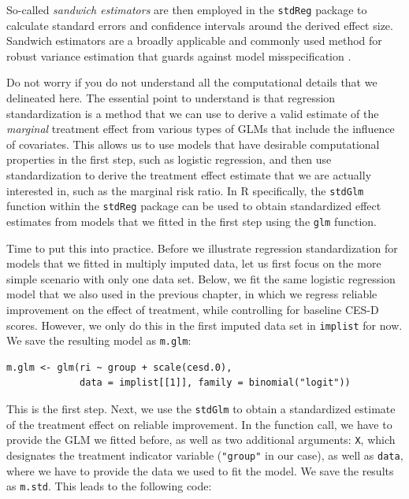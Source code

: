 So-called \emph{sandwich estimators} are then employed in the \texttt{stdReg} package to calculate standard errors and confidence intervals around the derived effect size. Sandwich estimators are a broadly applicable and commonly used method for robust variance estimation that guards against model misspecification \citep[see e.g.][, chap. 4.2.2]{aronow2019foundations}. 

Do not worry if you do not understand all the computational details that we delineated here. The essential point to understand is that regression standardization is a method that we can use to derive a valid estimate of the \emph{marginal} treatment effect from various types of GLMs that include the influence of covariates. This allows us to use models that have desirable computational properties in the first step, such as logistic regression, and then use standardization to derive the treatment effect estimate that we are actually interested in, such as the marginal risk ratio. In \textsf{R} specifically, the \texttt{stdGlm} function within the \texttt{stdReg} package can be used to obtain standardized effect estimates from models that we fitted in the first step using the \texttt{glm} function.

Time to put this into practice. Before we illustrate regression standardization for models that we fitted in multiply imputed data, let us first focus on the more simple scenario with only one data set. Below, we fit the same logistic regression model that we also used in the previous chapter, in which we regress reliable improvement on the effect of treatment, while controlling for baseline CES-D scores. However, we only do this in the first imputed data set in \texttt{implist} for now. We save the resulting model as \texttt{m.glm}:

\begin{lstlisting}
m.glm <- glm(ri ~ group + scale(cesd.0), 
             data = implist[[1]], family = binomial("logit"))
\end{lstlisting}

This is the first step. Next, we use the \texttt{stdGlm} to obtain a standardized estimate of the treatment effect on reliable improvement. In the function call, we have to provide the GLM we fitted before, as well as two additional arguments: \texttt{X}, which designates the treatment indicator variable (\texttt{"group"} in our case), as well as \texttt{data}, where we have to provide the data we used to fit the model. We save the results as \texttt{m.std}. This leads to the following code:

